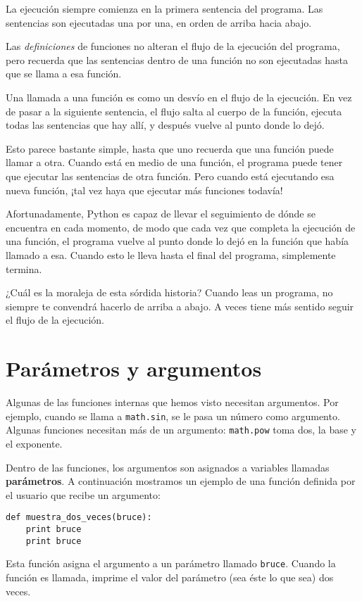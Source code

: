 La ejecución siempre comienza en la primera sentencia del programa.
Las sentencias son ejecutadas una por una, en orden de arriba hacia abajo.

Las \emph{definiciones} de funciones no alteran el flujo de la ejecución del
programa, pero recuerda que las sentencias dentro de una función no son
ejecutadas hasta que se llama a esa función.

Una llamada a una función es como un desvío en el flujo de la ejecución. En vez
de pasar a la siguiente sentencia, el flujo salta al cuerpo de
la función, ejecuta todas las sentencias que hay allí, y después vuelve
al punto donde lo dejó.

Esto parece bastante simple, hasta que uno recuerda que una función puede
llamar a otra. Cuando está en medio de una función, el programa puede
tener que ejecutar las sentencias de otra función. Pero cuando
está ejecutando esa nueva función, ¡tal vez haya que ejecutar
más funciones todavía!

Afortunadamente, Python es capaz de llevar el seguimiento de dónde se encuentra en cada momento, de modo
que cada vez que completa la ejecución de una función, el programa vuelve al punto donde lo dejó
en la función que había llamado a esa. Cuando esto le lleva hasta el final del programa,
simplemente termina.

¿Cuál es la moraleja de esta sórdida historia? Cuando leas un programa, no
siempre te convendrá hacerlo de arriba a abajo. A veces tiene más
sentido seguir el flujo de la ejecución.

\section{Parámetros y argumentos}
\label{parameters}

Algunas de las funciones internas que hemos visto necesitan argumentos. Por
ejemplo, cuando se llama a {\tt math.sin}, se le pasa un número
como argumento. Algunas funciones necesitan más de un argumento:
{\tt math.pow} toma dos, la base y el exponente.

Dentro de las funciones, los argumentos son asignados a
variables llamadas {\bf parámetros}. A continuación mostramos un ejemplo
de una función definida por el usuario que recibe un argumento:


\beforeverb
\begin{verbatim}
def muestra_dos_veces(bruce):
    print bruce
    print bruce
\end{verbatim}
\afterverb
%
Esta función asigna el argumento a un parámetro
llamado {\tt bruce}. Cuando la función es llamada, imprime el valor del
parámetro (sea éste lo que sea) dos veces.

